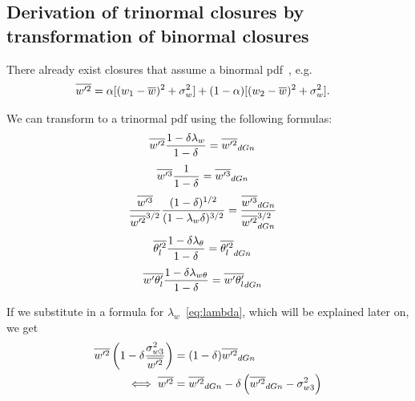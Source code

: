 \documentclass[10pt]{beamer}
\numberwithin{equation}{section}
\begin{document}
    \subsection{Derivation of trinormal closures by transformation of binormal closures}
    \label{subsec:derivation-of-trinormal-closures-by-transformation-of-binormal-closures}

    \begin{frame}
        There already exist closures that assume a binormal pdf~\autocite{larson2005using}, e.g.
        \begin{align}
            \label{eq:wp2_bar_dGn}
            \overline{w'^2}
            &= \alpha [(w_1 - \overline{w})^2 + \sigma_w^2]
            + (1 - \alpha) [(w_2 - \overline{w})^2 + \sigma_w^2].
        \end{align}
    \end{frame}

    \begin{frame}
        We can transform to a trinormal pdf using the following formulas:
        \begin{align}
            \label{eq:w_prime_2_transform}
            \overline{w'^2} \frac{1 - \delta\lambda_w}{1 - \delta}
            &= \overline{w'^2}_{dGn}
        \end{align}
        \begin{align}
            \label{eq:w_prime_3_transform}
            \overline{w'^3} \frac{1}{1 - \delta}
            &= \overline{w'^3}_{dGn}
        \end{align}
        \begin{align}
            \label{eq:w_prime_3_div_w_prime_2_transform}
            \frac{\overline{w'^3}}{\overline{w'^2}^{3/2}} \frac{(1 - \delta)^{1/2}}{(1 - \lambda_w\delta)^{3/2}}
            &= \frac{\overline{w'^3}_{dGn}}{\overline{w'^2}_{dGn}^{3/2}}
        \end{align}
        \begin{align}
            \label{eq:theta_l_prime_transform}
            \overline{\theta_l'^2} \frac{1 - \delta\lambda_\theta}{1 - \delta}
            &= \overline{\theta_l'^2}_{dGn}
        \end{align}
        \begin{align}
            \label{eq:w_prime_theta_l_prime_transform}
            \overline{w' \theta_l'} \frac{1 - \delta\lambda_{w\theta}}{1 - \delta}
            &= \overline{w' \theta_l'}_{dGn}
        \end{align}
    \end{frame}

    \begin{frame}
        If we substitute in a formula for $\lambda_w$~\eqref{eq:lambda}, which will be explained later on, we get
        \begin{align}
            \overline{w'^2} \left(1 - \delta\frac{\sigma_{w 3}^2}{\overline{w'^2}}\right)
            &= (1 - \delta)\overline{w'^2}_{dGn} \\
            \iff \overline{w'^2}
            &= \overline{w'^2}_{dGn} - \delta\left(\overline{w'^2}_{dGn} - \sigma_{w 3}^2\right)
        \end{align}
    \end{frame}
\end{document}
